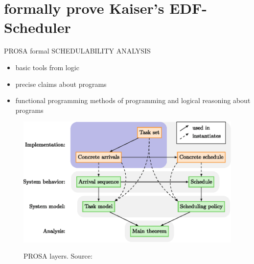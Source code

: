 \documentclass{beamer}
\begin{document}
	
	\section{formally prove Kaiser's EDF-Scheduler}
	
	
	\begin{frame}{PROSA formal SCHEDULABILITY ANALYSIS}	
		\begin{itemize}
			\item basic tools from logic
			\item precise claims about programs
			\item functional programming methods of programming and logical reasoning about programs
		 \end{itemize}
		  
		 \begin{figure}[h]
					\includegraphics[width=.6\textwidth]{PROSALayers.eps}
					\label{fig:screenshot-proof-general}
					\caption{PROSA layers. Source:\cite{certikos_formal_schedulability}}
		 \end{figure}    	
		 
      \end{frame}
		  
\end{document}
